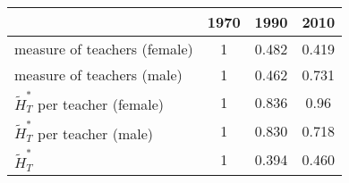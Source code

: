 \begin{table}
  \centering \begin{tabular}{lccc}
\toprule
& 1970 & 1990 & 2010 \\
\midrule
measure of teachers (female) & 1 & 0.482 &0.419\\
measure of teachers (male) & 1 & 0.462 & 0.731\\
$\widetilde{H}_T^*$ per teacher (female)   & 1 & 0.836 & 0.96 \\
$\widetilde{H}_T^*$ per teacher (male)   & 1 & 0.830 & 0.718 \\
$\widetilde{H}_T^*$ & 1  & 0.394 & 0.460 \\
\bottomrule
\end{tabular}
  \label{ }
\end{table}